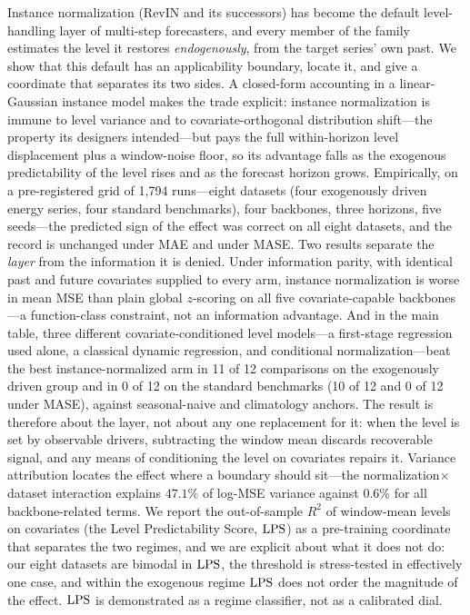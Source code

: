 Instance normalization (RevIN and its successors) has become the default level-handling layer of multi-step forecasters, and every member of the family estimates the level it restores \emph{endogenously}, from the target series' own past. We show that this default has an applicability boundary, locate it, and give a coordinate that separates its two sides. A closed-form accounting in a linear-Gaussian instance model makes the trade explicit: instance normalization is immune to level variance and to covariate-orthogonal distribution shift---the property its designers intended---but pays the full within-horizon level displacement plus a window-noise floor, so its advantage falls as the exogenous predictability of the level rises and as the forecast horizon grows. Empirically, on a pre-registered grid of 1{,}794 runs---eight datasets (four exogenously driven energy series, four standard benchmarks), four backbones, three horizons, five seeds---the predicted sign of the effect was correct on all eight datasets, and the record is unchanged under MAE and under MASE. Two results separate the \emph{layer} from the information it is denied. Under information parity, with identical past and future covariates supplied to every arm, instance normalization is worse in mean MSE than plain global $z$-scoring on all five covariate-capable backbones---a function-class constraint, not an information advantage. And in the main table, three different covariate-conditioned level models---a first-stage regression used alone, a classical dynamic regression, and conditional normalization---beat the best instance-normalized arm in 11 of 12 comparisons on the exogenously driven group and in 0 of 12 on the standard benchmarks (10 of 12 and 0 of 12 under MASE), against seasonal-naive and climatology anchors. The result is therefore about the layer, not about any one replacement for it: when the level is set by observable drivers, subtracting the window mean discards recoverable signal, and any means of conditioning the level on covariates repairs it. Variance attribution locates the effect where a boundary should sit---the normalization$\times$dataset interaction explains $47.1\%$ of log-MSE variance against $0.6\%$ for all backbone-related terms. We report the out-of-sample $R^2$ of window-mean levels on covariates (the Level Predictability Score, $\mathrm{LPS}$) as a pre-training coordinate that separates the two regimes, and we are explicit about what it does not do: our eight datasets are bimodal in $\mathrm{LPS}$, the threshold is stress-tested in effectively one case, and within the exogenous regime $\mathrm{LPS}$ does not order the magnitude of the effect. $\mathrm{LPS}$ is demonstrated as a regime classifier, not as a calibrated dial.
